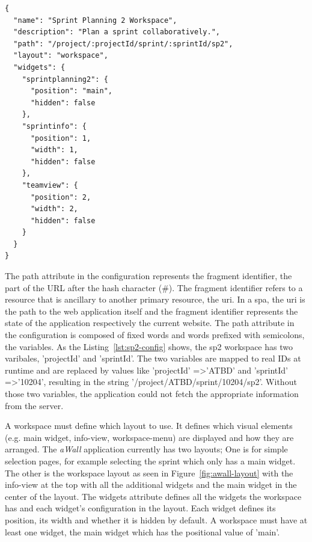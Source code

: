 \documentclass{sigchi}
\begin{document}
\begin{lstlisting}
{
  "name": "Sprint Planning 2 Workspace",
  "description": "Plan a sprint collaboratively.",
  "path": "/project/:projectId/sprint/:sprintId/sp2",
  "layout": "workspace",
  "widgets": {
    "sprintplanning2": {
      "position": "main",
      "hidden": false
    },
    "sprintinfo": {
      "position": 1,
      "width": 1,
      "hidden": false
    },
    "teamview": {
      "position": 2,
      "width": 2,
      "hidden": false
    }
  }
}
\end{lstlisting}


The path attribute in the configuration represents the fragment identifier, the part of the URL after the hash character (\#).
The fragment identifier refers to a resource that is ancillary to another primary resource, the \gls{uri}.
In a \gls{spa}, the \gls{uri} is the path to the web application itself and the fragment identifier represents the state of the application respectively the current website.
The path attribute in the configuration is composed of fixed words and words prefixed with semicolons, the variables.
As the Listing~\ref{lst:sp2-config} shows, the \gls{sp2} workspace has two varibales, 'projectId' and 'sprintId'.
The two variables are mapped to real IDs at runtime and are replaced by values like 'projectId' =\textgreater 'ATBD' and 'sprintId' =\textgreater '10204', resulting in the string '/project/ATBD/sprint/10204/sp2'.
Without those two variables, the application could not fetch the appropriate information from the server.

A workspace must define which layout to use.
It defines which visual elements (e.g. main widget, info-view, workspace-menu) are displayed and how they are arranged.
The \textit{aWall} application currently has two layouts; One is for simple selection pages, for example selecting the sprint which only has a main widget.
The other is the workspace layout as seen in Figure~\ref{fig:awall-layout} with the info-view at the top with all the additional widgets and the main widget in the center of the layout.
The widgets attribute defines all the widgets the workspace has and each widget's configuration in the layout.
Each widget defines its position, its width and whether it is hidden by default.
A workspace must have at least one widget, the main widget which has the positional value of 'main'.
\end{document}
